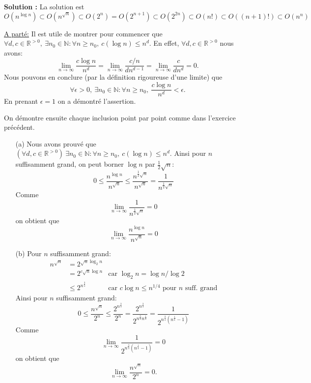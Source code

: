 \documentclass[11pt]{article} %
\newenvironment{solution}[1][\unskip]{%
	\par
	\noindent
	\textbf{Solution #1:}
	\noindent}
{\medskip}
\begin{document}
\begin{solution}
	La solution est
	$$O(n^{\log n})\subset O(n^{\sqrt{n}}) \subset O(2^n)=O(2^{n+1})\subset O(2^{2n}) \subset O(n!) \subset O((n+1)!) \subset O(n^n)$$
	
	\underline{A parté:} Il est utile de montrer pour commencer que $\forall d,c  \in \mathbb{R}^{>0},\ \exists n_0\in \mathbb{N} : \forall n\geq n_0, \ c(\log n) \leq n^d$. En effet, $\forall d,c  \in \mathbb{R}^{>0}$ nous avons:
	$$\lim\limits_{n\rightarrow \infty}\frac{c\log n}{n^d}=\lim\limits_{n\rightarrow \infty}\frac{c/n}{dn^{d-1}}=\lim\limits_{n\rightarrow \infty}\frac{c}{dn^d}=0.$$ 	
	Nous pouvons en conclure (par la définition rigoureuse d'une limite) que
	$$\forall \epsilon>0,\ \exists n_0 \in \mathbb{N} : \forall n\geq n_0,\ \frac{c\log n}{n^d} < \epsilon.$$	
	En prenant $\epsilon=1$ on a démontré l'assertion.
	
	On démontre ensuite chaque inclusion point par point comme dans l'exercice précédent.
	\begin{itemize}
		\item[(a)] Nous avons prouvé que $(\forall d,c \in \mathbb{R}^{>0}) \ \exists n_0\in \mathbb{N} : \forall n\geq n_0, \ c(\log n) \leq n^d$. Ainsi pour $n$ suffisamment grand, on peut borner $\log n$ par $\frac{1}{2}\sqrt{n}$:
		\begin{equation*}
		0\leq \frac{n^{\log n}}{n^{\sqrt{n}}}\leq \frac{n^{\frac{1}{2}\sqrt{n}}}{n^{\sqrt{n}}}=\frac{1}{n^{\frac{1}{2}\sqrt{n}}}
		\end{equation*}
		Comme 
		$$\lim\limits_{n\rightarrow \infty}\frac{1}{n^{\frac{1}{2}\sqrt{n}}}=0$$
		on obtient que 
		$$\lim\limits_{n\rightarrow \infty}\frac{n^{\log n}}{n^{\sqrt{n}}}=0$$ 
		\item[(b)]
		Pour $n$ suffisamment grand:
		\begin{align*}
		n^{\sqrt{n}}&=2^{\sqrt{n}\log_2 n}&\\
		&=2^{c\sqrt{n}\log n}& \text{car } \log_2n=\log n/\log 2\\
		&\leq 2^{n^{\frac{3}{4}}}& \text{car }c\log n \leq n^{1/4} \text{ pour }n\text{ suff. grand}
		\end{align*}
		Ainsi pour $n$ suffisamment grand:
		$$0\leq\frac{n^{\sqrt{n}}}{2^n}\leq\frac{2^{n^{\frac{3}{4}}}}{2^n}= \frac{2^{n^{\frac{3}{4}}}}{2^{n^{\frac{3}{4}}n^{\frac{1}{4}}}}=
		\frac{1}{2^{n^{\frac{3}{4}}(n^{\frac{1}{4}}-1)}}$$
		Comme 
		$$\lim\limits_{n\rightarrow \infty}\frac{1}{2^{n^{\frac{3}{4}}(n^{\frac{1}{4}}-1)}}=0$$
		on obtient que 
		$$\lim\limits_{n\rightarrow \infty}\frac{n^{\sqrt{n}}}{2^n}=0.$$
		

\end{itemize}
\end{solution}
\end{document}
